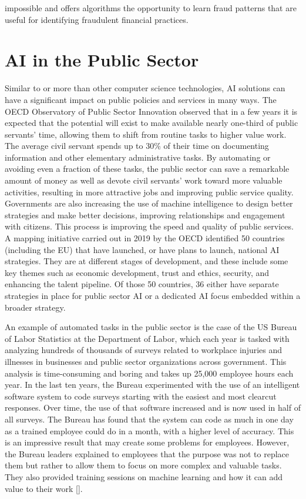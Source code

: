 {\noindent impossible and offers algorithms the opportunity to learn fraud patterns that are useful for identifying fraudulent financial practices.}

\section{\label{sec:6.8}AI in the Public Sector}

Similar to or more than other computer science technologies, AI solutions can have a significant impact on public policies and services in many ways. The OECD Observatory of Public Sector Innovation observed that in a few years it is expected that the potential will exist to make available nearly one-third of public servants' time, allowing them to shift from routine tasks to higher value work. The average civil servant spends up to 30\% of their time on documenting information and other elementary administrative tasks. By automating or avoiding even a fraction of these tasks, the public sector can save a remarkable amount of money as well as devote civil servants' work toward more valuable activities, resulting in more attractive jobs and improving public service quality. Governments are also increasing the use of machine intelligence to design better strategies and make better decisions, improving relationships and engagement with citizens. This process is improving the speed and quality of public services. A mapping initiative carried out in 2019 by the OECD identified 50 countries (including the EU) that have launched, or have plans to launch, national AI strategies. They are at different stages of development, and these include some key themes such as economic development, trust and ethics, security, and enhancing the talent pipeline. Of those 50 countries, 36 either have separate strategies in place for public sector AI or a dedicated AI focus embedded within a broader strategy.

An example of automated tasks in the public sector is the case of the US Bureau of Labor Statistics at the Department of Labor, which each year is tasked with analyzing hundreds of thousands of surveys related to workplace injuries and illnesses in businesses and public sector organizations across government. This analysis is time-consuming and boring and takes up 25,000 employee hours each year. In the last ten years, the Bureau experimented with the use of an intelligent software system to code surveys starting with the easiest and most clearcut responses. Over time, the use of that software increased and is now used in half of all surveys. The Bureau has found that the system can code as much in one day as a trained employee could do in a month, with a higher level of accuracy. This is an impressive result that may create some problems for employees. However, the Bureau leaders explained to employees that the purpose was not to replace them but rather to allow them to focus on more complex and valuable tasks. They also provided training sessions on machine learning and how it can add value to their work [\citealt{chap:6:ChenokandYusti:2018}].

